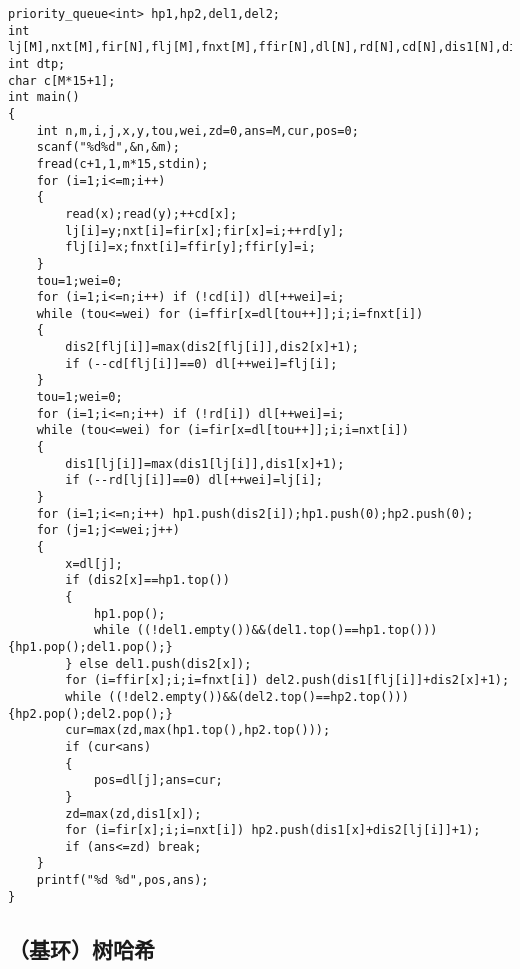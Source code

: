 \documentclass[12pt]{ctexart}
\begin{document}
\begin{lstlisting}
priority_queue<int> hp1,hp2,del1,del2;
int lj[M],nxt[M],fir[N],flj[M],fnxt[M],ffir[N],dl[N],rd[N],cd[N],dis1[N],dis2[N];
int dtp;
char c[M*15+1];
int main()
{
	int n,m,i,j,x,y,tou,wei,zd=0,ans=M,cur,pos=0;
	scanf("%d%d",&n,&m);
	fread(c+1,1,m*15,stdin);
	for (i=1;i<=m;i++)
	{
		read(x);read(y);++cd[x];
		lj[i]=y;nxt[i]=fir[x];fir[x]=i;++rd[y];
		flj[i]=x;fnxt[i]=ffir[y];ffir[y]=i;
	}
	tou=1;wei=0;
	for (i=1;i<=n;i++) if (!cd[i]) dl[++wei]=i;
	while (tou<=wei) for (i=ffir[x=dl[tou++]];i;i=fnxt[i]) 
	{
		dis2[flj[i]]=max(dis2[flj[i]],dis2[x]+1);
		if (--cd[flj[i]]==0) dl[++wei]=flj[i];
	}
	tou=1;wei=0;
	for (i=1;i<=n;i++) if (!rd[i]) dl[++wei]=i;
	while (tou<=wei) for (i=fir[x=dl[tou++]];i;i=nxt[i]) 
	{
		dis1[lj[i]]=max(dis1[lj[i]],dis1[x]+1);
		if (--rd[lj[i]]==0) dl[++wei]=lj[i];
	}
	for (i=1;i<=n;i++) hp1.push(dis2[i]);hp1.push(0);hp2.push(0);
	for (j=1;j<=wei;j++)
	{
		x=dl[j];
		if (dis2[x]==hp1.top())
		{
			hp1.pop();
			while ((!del1.empty())&&(del1.top()==hp1.top())) {hp1.pop();del1.pop();}
		} else del1.push(dis2[x]);
		for (i=ffir[x];i;i=fnxt[i]) del2.push(dis1[flj[i]]+dis2[x]+1);
		while ((!del2.empty())&&(del2.top()==hp2.top())) {hp2.pop();del2.pop();}
		cur=max(zd,max(hp1.top(),hp2.top()));
		if (cur<ans)
		{
			pos=dl[j];ans=cur;
		}
		zd=max(zd,dis1[x]);
		for (i=fir[x];i;i=nxt[i]) hp2.push(dis1[x]+dis2[lj[i]]+1);
		if (ans<=zd) break;
	}
	printf("%d %d",pos,ans);
}
\end{lstlisting}

\subsection{（基环）树哈希}
\end{document}

